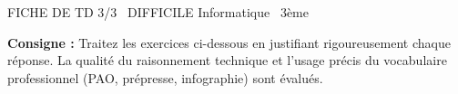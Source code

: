 \documentclass[11pt]{article}
\begin{document}
\begin{tcolorbox}[enhanced,colback=popink,colframe=popink,arc=10pt,boxrule=0pt,left=12pt,right=12pt,top=9pt,bottom=9pt]
{\color{white}\popxbold\small FICHE DE TD 3/3 \textbullet\ DIFFICILE \hfill Informatique \textbullet\ 3ème\par}
\end{tcolorbox}
\vspace{4pt}
\noindent\textbf{Consigne :} Traitez les exercices ci-dessous en justifiant rigoureusement chaque réponse. La qualité du raisonnement technique et l'usage précis du vocabulaire professionnel (PAO, prépresse, infographie) sont évalués.
\end{document}
